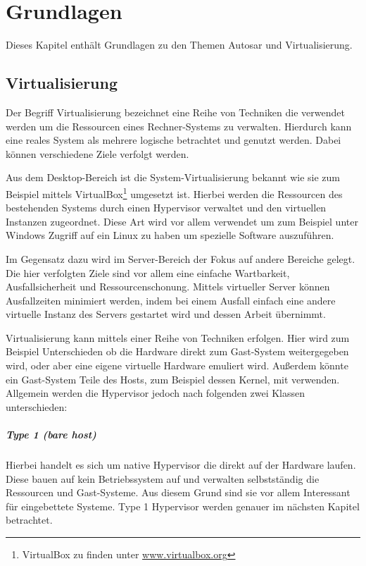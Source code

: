 \documentclass[
  a4paper,					    %
  twoside,
  DIV=calc,     				%
  bibliography=totoc,
  cleardoublepage=empty,
  ngerman,     					%
  final       					%
]{scrbook}
\begin{document}
\chapter{Grundlagen}
\label{sec:Grundlagen}
Dieses Kapitel enthält Grundlagen zu den Themen Autosar und Virtualisierung.


\section{Virtualisierung}
\label{sec:Virtualisierung}
Der Begriff Virtualisierung bezeichnet eine Reihe von Techniken die verwendet werden um die Ressourcen eines Rechner-Systems zu verwalten. Hierdurch kann eine reales System als mehrere logische betrachtet und genutzt werden. Dabei können verschiedene Ziele verfolgt werden.

Aus dem Desktop-Bereich ist die System-Virtualisierung bekannt wie sie zum Beispiel mittels VirtualBox\footnote{VirtualBox zu finden unter \url{www.virtualbox.org}} umgesetzt ist. Hierbei werden die Ressourcen des bestehenden Systems durch einen Hypervisor verwaltet und den virtuellen Instanzen zugeordnet. Diese Art wird vor allem verwendet um zum Beispiel unter Windows Zugriff auf ein Linux zu haben um spezielle Software auszuführen.

Im Gegensatz dazu wird im Server-Bereich der Fokus auf andere Bereiche gelegt. Die hier verfolgten Ziele sind vor allem eine einfache Wartbarkeit, Ausfallsicherheit und Ressourcenschonung. Mittels virtueller Server können Ausfallzeiten minimiert werden, indem bei einem Ausfall einfach eine andere virtuelle Instanz des Servers gestartet wird und dessen Arbeit übernimmt. 

Virtualisierung kann mittels einer Reihe von Techniken erfolgen. Hier wird zum Beispiel Unterschieden ob die Hardware direkt zum Gast-System weitergegeben wird, oder aber eine eigene virtuelle Hardware emuliert wird. Außerdem könnte ein Gast-System Teile des Hosts, zum Beispiel dessen Kernel, mit verwenden. Allgemein werden die Hypervisor jedoch nach folgenden zwei Klassen unterschieden\cite[Seite 22 ff.]{hypervisor}:

\paragraph{Type 1 (bare host)} Hierbei handelt es sich um native Hypervisor die direkt auf der Hardware laufen. Diese bauen auf kein Betriebssystem auf und verwalten selbstständig die Ressourcen und Gast-Systeme. Aus diesem Grund sind sie vor allem Interessant für eingebettete Systeme. Type 1 Hypervisor werden genauer im nächsten Kapitel betrachtet.
\end{document}
